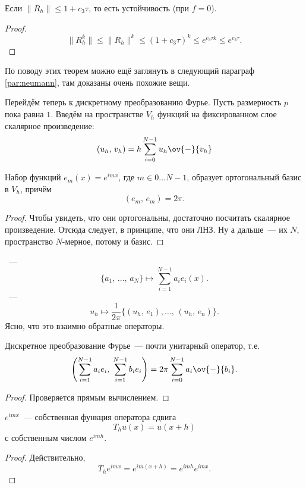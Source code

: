\documentclass{trlnotes}
\begin{document}
\begin{cor}
	Если $\|R_h\| \leqslant 1 + c_3\tau$, то есть устойчивость (при $f = 0$).
	\begin{proof}
		\[
			\|R_h^k\| \leqslant \|R_h\|^k \leqslant (1 + c_3 \tau)^k \leqslant e^{c_3 \tau k} \leqslant e^{c_3 \tau}.
		\]
	\end{proof}
\end{cor}

По поводу этих теорем можно ещё заглянуть в следующий параграф \ref{par:neumann}, там доказаны очень похожие вещи.

Перейдём теперь к дискретному преобразованию Фурье. Пусть размерность $p$ пока равна $1$. Введём на пространстве $V_h$ функций на фиксированном слое скалярное произведение:
\[
	(u_h, \, v_h) = h \sum\limits_{i = 0}^{N - 1} u_h \ov{-}{v_h}
\]

\begin{st}
	Набор функций $e_m(x) = e^{imx}$, где $m \in 0\ldots N-1$, образует ортогональный базис в $V_h$, причём
	\[
		(e_m, \, e_m) = 2\pi.
	\]
	\begin{proof}
		Чтобы увидеть, что они ортогональны, достаточно посчитать скалярное произведение. Отсюда следует, в принципе, что они ЛНЗ. Ну а дальше~--- их $N$, пространство $N$-мерное, потому и базис.
	\end{proof}
\end{st}

\begin{de}
	~---
	\[
		\{a_1, \, \ldots, \, a_N\} \mapsto \sum\limits_{i = 1}^{N-1} a_i e_i(x).
	\]
	~---
	\[
		u_h \mapsto \dfrac{1}{2\pi}\big\{(u_h, \, e_1), \ldots, \, (u_h, \, e_n)\big\}.
	\]
	Ясно, что это взаимно обратные операторы.
\end{de}

\begin{st}
	Дискретное преобразование Фурье~--- почти унитарный оператор, т.е. 
	\[
		\left(\sum\limits_{i = 1}^{N - 1} a_i e_i, \; \sum\limits_{i = 1}^{N - 1} b_i e_i\right) = 2 \pi \sum_{i = 0}^{N - 1} a_i \ov{-}{b_i}.
	\]
	\begin{proof}
		Проверяется прямым вычислением.
	\end{proof}
\end{st}

\begin{st}
	$e^{imx}$~--- собственная функция оператора сдвига
	\[
		T_h u(x) = u(x + h)
	\]
	с собственным числом $e^{imh}$.
	\begin{proof}
		Действительно,
		\[
			T_h e^{imx} = e^{im(x + h)} = e^{imh} e^{imx}.
		\]
	\end{proof}
\end{st}
\end{document}
